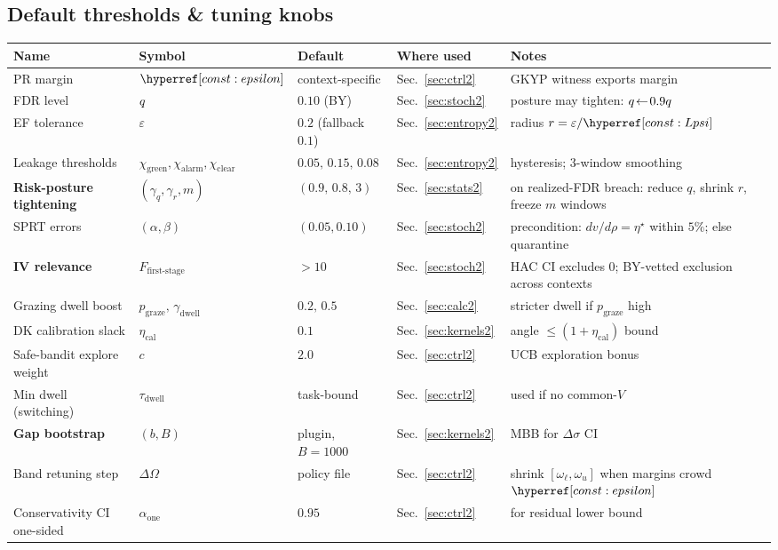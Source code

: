 \subsection{Default thresholds \& tuning knobs}\label{app:defaults}
\begin{center}
\renewcommand{\arraystretch}{1.12}
\begin{tabularx}{\textwidth}{@{} l l l l l @{}}
\toprule
\textbf{Name} & \textbf{Symbol} & \textbf{Default} & \textbf{Where used} & \textbf{Notes} \\
\midrule
PR margin & $\constref{epsilon}$ & context-specific & Sec.~\ref{sec:ctrl2} & GKYP witness exports margin \\
FDR level & $q$ & $0.10$ (BY) & Sec.~\ref{sec:stoch2} & posture may tighten: $q\!\leftarrow\!0.9q$ \\
EF tolerance & $\varepsilon$ & $0.2$ (fallback $0.1$) & Sec.~\ref{sec:entropy2} & radius $r=\varepsilon/\constref{Lpsi}$ \\
Leakage thresholds & $\chi_{\mathrm{green}},\chi_{\mathrm{alarm}},\chi_{\mathrm{clear}}$ & $0.05,\,0.15,\,0.08$ & Sec.~\ref{sec:entropy2} & hysteresis; 3-window smoothing \\
\textbf{Risk-posture tightening} & $(\gamma_q,\gamma_r,m)$ & $(0.9,\,0.8,\,3)$ & Sec.~\ref{sec:stats2} & on realized-FDR breach: reduce $q$, shrink $r$, freeze $m$ windows \\
SPRT errors & $(\alpha,\beta)$ & $(0.05,0.10)$ & Sec.~\ref{sec:stoch2} & precondition: $dv/d\rho=\eta^\star$ within $5\%$; else quarantine \\
\textbf{IV relevance} & $F_{\text{first-stage}}$ & $>10$ & Sec.~\ref{sec:stoch2} & HAC CI excludes 0; BY-vetted exclusion across contexts \\
Grazing dwell boost & $p_{\mathrm{graze}},\,\gamma_{\mathrm{dwell}}$ & $0.2,\,0.5$ & Sec.~\ref{sec:calc2} & stricter dwell if $p_{\mathrm{graze}}$ high \\
DK calibration slack & $\eta_{\mathrm{cal}}$ & $0.1$ & Sec.~\ref{sec:kernels2} & angle $\le (1+\eta_{\mathrm{cal}})$ bound \\
Safe-bandit explore weight & $c$ & $2.0$ & Sec.~\ref{sec:ctrl2} & UCB exploration bonus \\
Min dwell (switching) & $\tau_{\mathrm{dwell}}$ & task-bound & Sec.~\ref{sec:ctrl2} & used if no common-$V$ \\
\textbf{Gap bootstrap} & $(b,B)$ & plugin, $B{=}1000$ & Sec.~\ref{sec:kernels2} & MBB for $\Delta\sigma$ CI \\
Band retuning step & $\Delta\Omega$ & policy file & Sec.~\ref{sec:ctrl2} & shrink $[\omega_\ell,\omega_u]$ when margins crowd $\constref{epsilon}$ \\
Conservativity CI one-sided & $\alpha_{\mathrm{one}}$ & $0.95$ & Sec.~\ref{sec:ctrl2} & for residual lower bound \\
\bottomrule
\end{tabularx}
\end{center}

